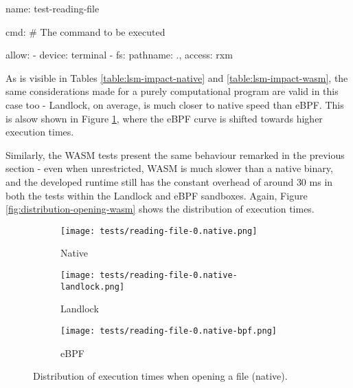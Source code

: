\vspace*{0.5cm}
\begin{code}[language=yaml, caption=The outline of the policy used for testing the reading program., label=lst:outline-policy-reading-test]
name: test-reading-file

cmd: # The command to be executed

allow:
  - device: terminal
  - fs: {pathname: ., access: rxm}
\end{code}

As is visible in Tables \ref{table:lsm-impact-native} and \ref{table:lsm-impact-wasm},
the same considerations made for a purely computational program are valid in this case too
- Landlock, on average, is much closer to native speed than eBPF.
This is alsow shown in Figure \ref{fig:distribution-opening-native}, where the eBPF curve is shifted towards
higher execution times.

Similarly, the WASM tests present the same behaviour remarked in the previous section -
even when unrestricted, WASM is much slower than a native binary, and the developed runtime
still has the constant overhead of around $30$ ms in both the tests within the Landlock and eBPF sandboxes.
Again, Figure \ref{fig:distribution-opening-wasm} shows the distribution of execution times.

\begin{figure}[ht]
  \centering
  \begin{subfigure}[b]{0.32\textwidth}
    \centering
    \texttt{[image: tests/reading-file-0.native.png]}
    \caption{Native}
  \end{subfigure}
  \begin{subfigure}[b]{0.32\textwidth}
    \centering
    \texttt{[image: tests/reading-file-0.native-landlock.png]}
    \caption{Landlock}
  \end{subfigure}
  \begin{subfigure}[b]{0.32\textwidth}
    \centering
    \texttt{[image: tests/reading-file-0.native-bpf.png]}
    \caption{eBPF}
  \end{subfigure}
  \caption{Distribution of execution times when opening a file (native).}
  \label{fig:distribution-opening-native}
\end{figure}

